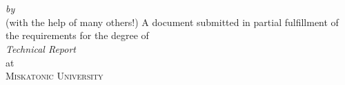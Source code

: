 \begin{titlepage}
  \vspace*{5cm}
  \makeatletter
  \begin{center}
    \begin{Huge}
      \@title
    \end{Huge}\\[0.1cm]
    \begin{Large}
      \@subtitle
    \end{Large}\\
    \emph{by}\\
    \@author (with the help of many others!)
    \vfill
    A document submitted in partial fulfillment
    of the requirements for the degree of\\
    \emph{Technical Report}\\
    at\\
    \textsc{Miskatonic University}
  \end{center}
  \makeatother
\end{titlepage}

\newpage
\null
\thispagestyle{empty}
\newpage
